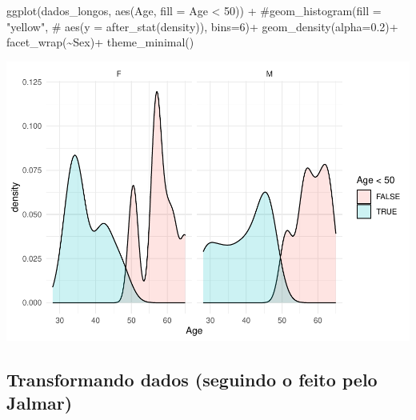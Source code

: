\documentclass[
]{article}
\newenvironment{Shaded}{\begin{snugshade}}{\end{snugshade}}
\newcommand{\AttributeTok}[1]{\textcolor[rgb]{0.80,0.80,0.80}{#1}}
\newcommand{\CommentTok}[1]{\textcolor[rgb]{0.50,0.62,0.50}{#1}}
\newcommand{\DecValTok}[1]{\textcolor[rgb]{0.86,0.86,0.80}{#1}}
\newcommand{\FloatTok}[1]{\textcolor[rgb]{0.75,0.75,0.82}{#1}}
\newcommand{\FunctionTok}[1]{\textcolor[rgb]{0.94,0.94,0.56}{#1}}
\newcommand{\NormalTok}[1]{\textcolor[rgb]{0.80,0.80,0.80}{#1}}
\newcommand{\SpecialCharTok}[1]{\textcolor[rgb]{0.86,0.64,0.64}{#1}}
\begin{document}
\begin{Shaded}
\begin{Highlighting}[]
\FunctionTok{ggplot}\NormalTok{(dados\_longos, }\FunctionTok{aes}\NormalTok{(Age, }\AttributeTok{fill =}\NormalTok{ Age }\SpecialCharTok{\textless{}} \DecValTok{50}\NormalTok{)) }\SpecialCharTok{+} 
  \CommentTok{\#geom\_histogram(fill = "yellow", }
  \CommentTok{\#               aes(y = after\_stat(density)), bins=6)+}
  \FunctionTok{geom\_density}\NormalTok{(}\AttributeTok{alpha=}\FloatTok{0.2}\NormalTok{)}\SpecialCharTok{+}
  \FunctionTok{facet\_wrap}\NormalTok{(}\SpecialCharTok{\textasciitilde{}}\NormalTok{Sex)}\SpecialCharTok{+}
  \FunctionTok{theme\_minimal}\NormalTok{()}
\end{Highlighting}
\end{Shaded}

\includegraphics{EDA__files/figure-latex/unnamed-chunk-5-4.pdf}

\hypertarget{transformando-dados-seguindo-o-feito-pelo-jalmar}{%
\subsection{Transformando dados (seguindo o feito pelo
Jalmar)}\label{transformando-dados-seguindo-o-feito-pelo-jalmar}}
\end{document}
